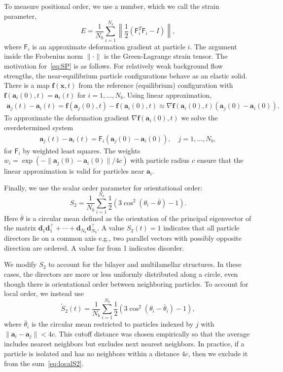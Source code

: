 \documentclass[prb,preprint,showpacs,preprintnumbers,amsmath,amssymb,longbibliography]{revtex4-1}
\renewcommand{\aa}{\mathbf{a}}
\newcommand{\dd}{\mathbf{d}}
\newcommand{\ff}{\mathbf{f}}
\newcommand{\xx}{\mathbf{x}}
\begin{document}
To measure positional order, we use a number, which we call the strain
parameter, 
\begin{equation}
\label{eq:SP}
E = \frac{1}{N_b} \sum_{i=1}^{N_b}
\left\|\frac{1}{2}(\mathsf{F}_i^T \mathsf{F}_i - I)\right\|,
\end{equation}
where $\mathsf{F}_i$ is an approximate deformation gradient at particle
$i$. The argument inside the Frobenius norm $\| \cdot \|$ is the
Green-Lagrange strain tensor. The motivation for~\eqref{eq:SP} is as
follows. For relatively weak background flow strengths, the
near-equilibrium particle configurations behave as an elastic solid.
There is a map $\ff(\xx,t)$ from the reference (equilibrium)
configuration with $\ff(\aa_i(0),t) = \aa_i(t)$ for $i = 1,\ldots,N_b$.
Using linear approximation,
\begin{align}
\aa_j(t) - \aa_i(t) = \ff(\aa_j(0),t) - \ff(\aa_i(0),t)
\approx \nabla \ff(\aa_i(0),t)(\aa_j(0) - \aa_i(0)).
\end{align}
To approximate the deformation gradient $\nabla \ff(\aa_i(0),t)$ we
solve the overdetermined system 
\begin{align}
\aa_j(t) - \aa_i(t) = \mathsf{F}_i(\aa_j(0) - \aa_i(0)),\quad j =
  1,\ldots, N_b,
\end{align}
for $\mathsf{F}_i$ by weighted least squares. The weights $w_i =
\exp(-\|\aa_j(0) - \aa_i(0)\|/4c)$ with particle radius $c$ ensure that
the linear approximation is valid for particles near $\aa_i$.

Finally, we use the scalar order parameter for orientational order:
\begin{equation}
  \label{eq:S2}
S_2 = \frac{1}{N_b} \sum_{i=1}^{N_b} \frac{1}{2}(3\cos^2(\theta_i - \bar \theta) - 1).
\end{equation}
Here $\bar \theta$ is a circular mean defined as the orientation of the
principal eigenvector of the matrix $\dd_1\dd_1^\top + \cdots +
\dd_{N_b}\dd_{N_b}^\top$. A value $S_2(t) = 1$ indicates that all
particle directors lie on a common axis e.g., two parallel vectors with
possibly opposite direction are ordered. A value far from 1 indicates
disorder.

We modify $S_2$ to account for the bilayer and multilamellar structures.
In these cases, the directors are more or less uniformly distributed
along a circle, even though there is orientational order between
neighboring particles. To account for local order, we instead use
\begin{equation}
  \label{eq:localS2}
\tilde{S}_2(t) = \frac{1}{N_b} \sum_{i=1}^{N_b}
\frac{1}{2}(3\cos^2(\theta_i - \bar \theta_i) - 1),
\end{equation}
where $\bar \theta_i$ is the circular mean restricted to particles
indexed by $j$ with $\|\aa_i - \aa_j\| < 4c$.
This cutoff distance was chosen empirically
so that the average includes nearest neighbors
but excludes next nearest neighbors.
In practice, if a particle
is isolated and has no neighbors within a distance $4c$, then we exclude
it from the sum~\eqref{eq:localS2}. 
\end{document}
